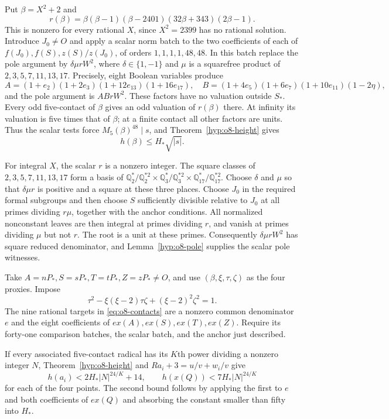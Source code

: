 \documentclass[11pt]{article}
\theoremstyle{definition}
\theoremstyle{remark}
\newcommand{\Q}{\mathbb Q}
\begin{document}
Put $\beta=X^2+2$ and
\[
 r(\beta)=\beta(\beta-1)(\beta-2401)(32\beta+343)(2\beta-1).
\]
This is nonzero for every rational $X$, since $X^2=2399$ has no
rational solution. Introduce $J_0\ne O$ and apply a scalar norm
batch to the two coefficients of each of
$f(J_0),f(S),z(S)/z(J_0)$, of orders $1,1,1,1,48,48$.
In this batch replace the pole argument by $\delta\mu rW^2$, where
$\delta\in\{1,-1\}$ and $\mu$ is a squarefree product of
$2,3,5,7,11,13,17$. Precisely, eight Boolean variables produce
\[
 A=(1+e_2)(1+2e_3)(1+12e_{13})(1+16e_{17}),\quad
 B=(1+4e_5)(1+6e_7)(1+10e_{11})(1-2\eta),
\]
and the pole argument is $ABrW^2$. These factors have no valuation
outside $S_*$. Every odd five-contact of $\beta$ gives an odd
valuation of $r(\beta)$ there. At infinity its valuation is five
times that of $\beta$; at a finite contact all other factors are units.
Thus the scalar tests force $M_5(\beta)^{48}\mid s$, and
Theorem~\ref{hyp:o8-height} gives
\begin{equation}\label{eq:o8-scalarheight}
 h(\beta)\le H_*\sqrt{|s|}.
\end{equation}

For integral $X$, the scalar $r$ is a nonzero integer. The square
classes of $2,3,5,7,11,13,17$ form a basis of
$\Q_2^*/\Q_2^{*2}\times\Q_3^*/\Q_3^{*2}
\times\Q_{17}^*/\Q_{17}^{*2}$.
Choose $\delta$ and $\mu$ so that $\delta\mu r$ is positive and
a square at these three places. Choose $J_0$ in the required formal
subgroups and then choose $S$ sufficiently divisible relative to $J_0$
at all primes dividing $r\mu$, together with the anchor conditions.
All normalized nonconstant leaves are then integral at primes dividing
$r$, and vanish at primes dividing $\mu$ but not $r$. The root is
a unit at these primes. Consequently $\delta\mu rW^2$ has square
reduced denominator, and Lemma~\ref{hyp:o8-pole} supplies the
scalar pole witnesses.

Take $A=nP_*,S=sP_*,T=tP_*,Z=zP_*\ne O$, and use
$(\beta,\xi,\tau,\zeta)$ as the four proxies. Impose
\begin{equation}\label{eq:o8-Lucas}
 \tau^2-\xi(\xi-2)\tau\zeta+(\xi-2)^2\zeta^2=1.
\end{equation}
The nine rational targets in \eqref{eq:o8-contacts} are a nonzero
common denominator $e$ and the eight coefficients of
$ex(A),ex(S),ex(T),ex(Z)$. Require its forty-one comparison batches,
the scalar batch, and the anchor just described.

If every associated five-contact radical has its $K$th power dividing
a nonzero integer $N$, Theorem~\ref{hyp:o8-height} and
$Ra_i+3=u/v+w_i/v$ give
\[
 h(a_i)<2H_*|N|^{24/K}+14,
 \qquad h(x(Q))<7H_*|N|^{24/K}
\]
for each of the four points. The second bound follows by applying the
first to $e$ and both coefficients of $ex(Q)$ and absorbing the
constant smaller than fifty into $H_*$.
\end{document}

